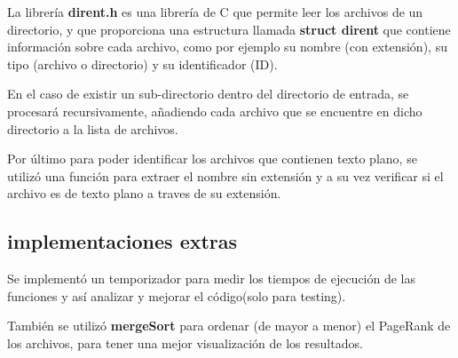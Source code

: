 La librería \textbf{dirent.h} es una librería de C que permite leer los archivos de un directorio, y que proporciona una estructura llamada \textbf{struct dirent} que contiene información sobre cada archivo, como por ejemplo su nombre (con extensión), su tipo (archivo o directorio) y su identificador (ID).

En el caso de existir un sub-directorio dentro del directorio de entrada, se procesará recursivamente, añadiendo cada archivo que se encuentre en dicho directorio a la lista de archivos.

Por último para poder identificar los archivos que contienen texto plano, se utilizó una función para extraer el nombre sin extensión y a su vez verificar si el archivo es de texto plano a traves de su extensión.

\subsection{implementaciones extras}
Se implementó un temporizador para medir los tiempos de ejecución de las funciones y así analizar y mejorar el código(solo para testing).

También se utilizó \textbf{mergeSort} para ordenar (de mayor a menor) el PageRank de los archivos, para tener una mejor visualización de los resultados.